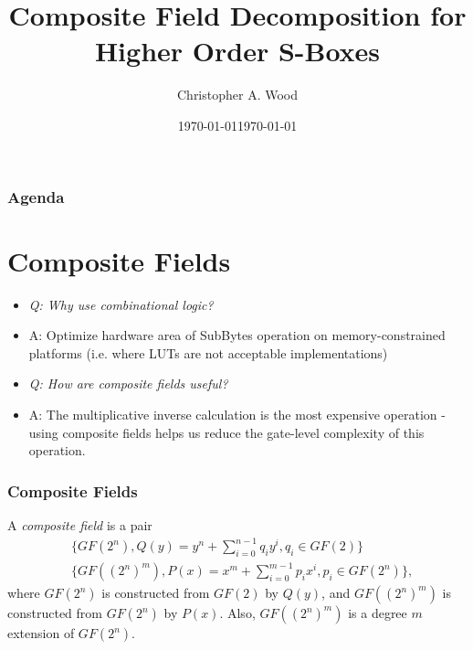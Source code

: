 \documentclass[handout]{beamer}
\title[Higher Order Composite Field Decomposition]{Composite Field Decomposition for Higher Order S-Boxes}
\institute[RIT]{}
\date{\today}
\author{Christopher A. Wood}
\date{\today}
\begin{document}

\begin{frame}
	\titlepage
\end{frame}

\begin{frame}
	\frametitle{Agenda}
	\tableofcontents
\end{frame}

\section{Composite Fields}
\begin{frame}
\begin{itemize}
	\item \emph{Q: Why use combinational logic?}
	\item A: Optimize hardware area of SubBytes operation on memory-constrained platforms (i.e. where LUTs are not acceptable implementations)
	\item \emph{Q: How are composite fields useful?}
	\item A: The multiplicative inverse calculation is the most expensive operation - using composite fields helps us reduce the gate-level complexity of this operation.
\end{itemize}
\end{frame}

\begin{frame}
	\frametitle{Composite Fields}
	A \emph{composite field} is a pair 
	\begin{align*}
	& \{GF(2^n), Q(y) = y^n + \sum_{i=0}^{n-1}q_iy^i, q_i \in GF(2)\} \\
	& \{GF((2^n)^m), P(x) = x^m + \sum_{i=0}^{m-1}p_ix^i, p_i \in GF(2^n)\},
	\end{align*}
	where $GF(2^n)$ is constructed from $GF(2)$ by $Q(y)$, and $GF((2^n)^m)$ is
	constructed from $GF(2^n)$ by $P(x)$. Also, $GF((2^n)^m)$ is a degree $m$ extension
	of $GF(2^n)$.
\end{frame}
\end{document}
